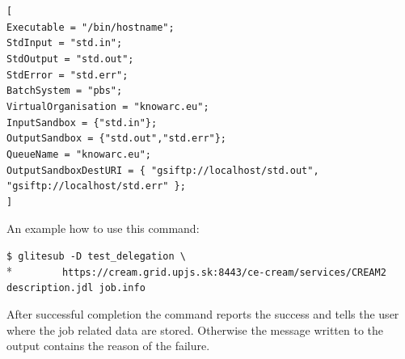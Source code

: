 \documentclass{article}
\begin{document}
\begin{minipage}{\textwidth}
\begin{framed}
\verb#[#\\
\verb#Executable = "/bin/hostname";#\\
\verb#StdInput = "std.in";#\\
\verb#StdOutput = "std.out";#\\
\verb#StdError = "std.err";#\\
\verb#BatchSystem = "pbs";#\\
\verb#VirtualOrganisation = "knowarc.eu";#\\
\verb#InputSandbox = {"std.in"};#\\
\verb#OutputSandbox = {"std.out","std.err"};#\\
\verb#QueueName = "knowarc.eu";#\\
\verb#OutputSandboxDestURI = { "gsiftp://localhost/std.out", "gsiftp://localhost/std.err" };#\\
\verb#]#
\end{framed}
\end{minipage}

An example how to use this command:
\begin{shaded}\verb#$ glitesub -D test_delegation \#\\*
\verb#        https://cream.grid.upjs.sk:8443/ce-cream/services/CREAM2 description.jdl job.info#\end{shaded}
After successful completion the command reports the success and tells the user where the job related data are stored. Otherwise the message written to the output contains the reason of the failure.
\end{document}
